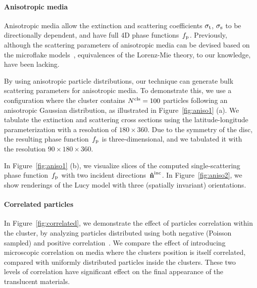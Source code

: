 


\paragraph{Anisotropic media}
Anisotropic media allow the extinction and scattering coefficients $\sigma_\mathrm{t}$, $\sigma_\mathrm{s}$ to be directionally dependent, and have full 4D phase functions~$f_\mathrm{p}$.
Previously, although the scattering parameters of anisotropic media can be devised based on the microflake models~\cite{jakob2010radiative,heitz2015sggx}, equivalences of the Lorenz-Mie theory, to our knowledge, have been lacking. 

By using anisotropic particle distributions, our technique can generate bulk scattering parameters for anisotropic media.
To demonstrate this, we use a configuration where the cluster contains ${N^\text{cls}} = 100$ particles following an anisotropic Gaussian distribution, as illustrated in Figure~\ref{fig:aniso1} (a).
We tabulate the extinction and scattering cross sections using the latitude-longitude parameterization with a resolution of $180 \times 360$.
Due to the symmetry of the disc, the resulting phase function~$f_\mathrm{p}$ is three-dimensional, and we tabulated it with the resolution $90 \times 180 \times360$.

In Figure~\ref{fig:aniso1} (b), we visualize slices of the computed single-scattering phase function~$f_\mathrm{p}$ with two incident directions~$\mathbf{\hat{n}}^{\text{inc}}$.
In Figure~\ref{fig:aniso2}, we show renderings of the Lucy model with three (spatially invariant) orientations.

\paragraph{Correlated particles}
In Figure~\ref{fig:correlated}, we demonstrate the effect of particles correlation within the cluster, by analyzing particles distributed using both negative (Poisson sampled) and positive correlation~\cite{jarabo2018radiative}. We compare the effect of introducing microscopic correlation on media where the clusters position is itself correlated, compared with uniformly distributed particles inside the clusters. These two levels of correlation have significant effect on the final appearance of the translucent materials. 




